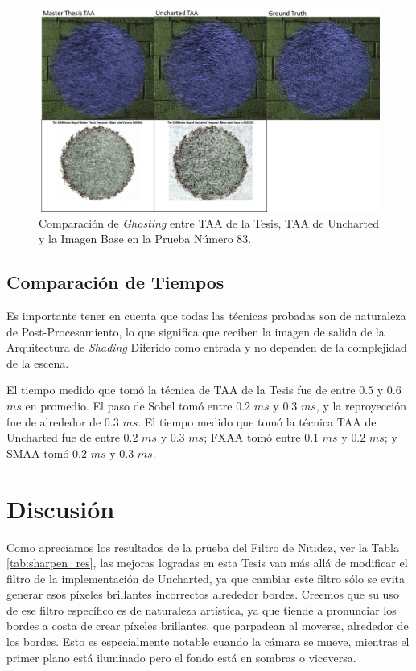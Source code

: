 \documentclass[pregrado]{tesis-usb} %
\begin{document}
\begin{figure}[!htb]
	\centering
	\includegraphics[scale=0.8]{images/results/hairball_ghosting_lighted.png}
	\caption{Comparación de \textit{Ghosting} entre TAA de la Tesis, TAA de Uncharted y la Imagen Base en la Prueba Número 83.}\label{fig:hairball_ghosting_lighted}
\end{figure}

\FloatBarrier
\subsection{Comparación de Tiempos} \label{result_timing}
Es importante tener en cuenta que todas las técnicas probadas son de naturaleza de Post-Procesamiento, lo que significa que reciben la imagen de salida de la Arquitectura de \textit{Shading} Diferido como entrada y no dependen de la complejidad de la escena.

El tiempo medido que tomó la técnica de TAA de la Tesis fue de entre $0.5$ y $0.6$ $ms$ en promedio. El paso de Sobel tomó entre $0.2$ $ms$ y $0.3$ $ms$, y la reproyección fue de alrededor de $0.3$ $ms$. El tiempo medido que tomó la técnica TAA de Uncharted fue de entre $0.2$ $ms$ y $0.3$ $ms$; FXAA tomó entre $0.1$ $ms$ y $0.2$ $ms$; y SMAA tomó $0.2$ $ms$ y $0.3$ $ms$.


\section{Discusión}
Como apreciamos los resultados de la prueba del Filtro de Nitidez, ver la Tabla \ref{tab:sharpen_res}, las mejoras logradas en esta Tesis van más allá de modificar el filtro de la implementación de Uncharted, ya que cambiar este filtro sólo se evita generar esos píxeles brillantes incorrectos alrededor bordes. Creemos que su uso de ese filtro específico es de naturaleza artística, ya que tiende a pronunciar los bordes a costa de crear píxeles brillantes, que parpadean al moverse, alrededor de los bordes. Esto es especialmente notable cuando la cámara se mueve, mientras el primer plano está iluminado pero el fondo está en sombras o viceversa.
\end{document}
